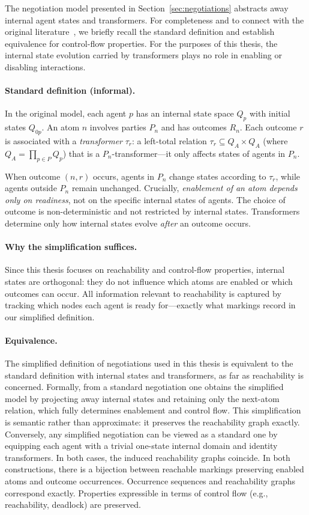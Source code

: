 The negotiation model presented in Section~\ref{sec:negotiations} abstracts away internal agent states and transformers. For completeness and to connect with the original literature~\cite{EsparzaDeselNegotiations}, we briefly recall the standard definition and establish equivalence for control-flow properties. For the purposes of this thesis, the internal state evolution carried by transformers plays no role in enabling or disabling interactions.

\paragraph{Standard definition (informal).} In the original model, each agent $p$ has an internal state space $Q_p$ with initial states $Q_{0p}$. An atom $n$ involves parties $P_n$ and has outcomes $R_n$. Each outcome $r$ is associated with a \emph{transformer} $\tau_r$: a left-total relation $\tau_r \subseteq Q_A \times Q_A$ (where $Q_A = \prod_{p \in P} Q_p$) that is a $P_n$-transformer—it only affects states of agents in $P_n$.

When outcome $(n,r)$ occurs, agents in $P_n$ change states according to $\tau_r$, while agents outside $P_n$ remain unchanged. Crucially, \emph{enablement of an atom depends only on readiness}, not on the specific internal states of agents. The choice of outcome is non-deterministic and not restricted by internal states. Transformers determine only how internal states evolve \emph{after} an outcome occurs.

\paragraph{Why the simplification suffices.} Since this thesis focuses on reachability and control-flow properties, internal states are orthogonal: they do not influence which atoms are enabled or which outcomes can occur. All information relevant to reachability is captured by tracking which nodes each agent is ready for—exactly what markings record in our simplified definition.

\paragraph{Equivalence.}
The simplified definition of negotiations used in this thesis is equivalent to the standard definition with internal states and transformers, as far as reachability is concerned. Formally, from a standard negotiation one obtains the simplified model by projecting away internal states and retaining only the next-atom relation, which fully determines enablement and control flow. This simplification is semantic rather than approximate: it preserves the reachability graph exactly. Conversely, any simplified negotiation can be viewed as a standard one by equipping each agent with a trivial one-state internal domain and identity transformers. In both cases, the induced reachability graphs coincide. In both constructions, there is a bijection between reachable markings preserving enabled atoms and outcome occurrences. Occurrence sequences and reachability graphs correspond exactly. Properties expressible in terms of control flow (e.g., reachability, deadlock) are preserved.


